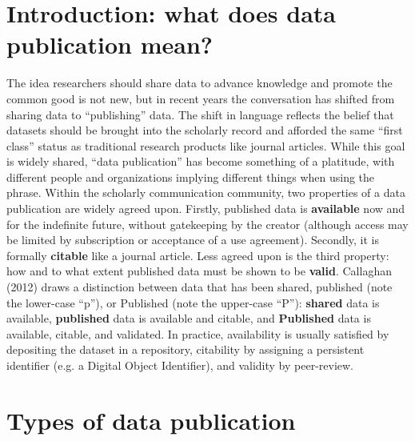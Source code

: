 \documentclass[10pt,a4paper,twocolumn]{article}
\begin{document}
\section*{Introduction: what does data publication mean?}\label{introduction}

The idea researchers should share data to advance knowledge and promote the common good is not new, but in recent years the conversation has shifted from sharing data to ``publishing'' data.\cite{costello_motivating_2009,smith_data_2009,lawrence_data_2011,callaghan_making_2012} 
The shift in language reflects the belief that datasets should be brought into the scholarly record and afforded the same ``first class'' status as traditional research products like journal articles.  
While this goal is widely shared, ``data publication'' has become something of a platitude, with different people and organizations implying different things when using the phrase.
Within the scholarly communication community, two properties of a data publication are widely agreed upon.\cite{smith_data_2009,callaghan_making_2012}
Firstly, published data is \textbf{available} now and for the indefinite future, without gatekeeping by the creator (although access may be limited by subscription or acceptance of a use agreement).
Secondly, it is formally \textbf{citable} like a journal article.
Less agreed upon is the third property: how and to what extent published data must be shown to be \textbf{valid}.
Callaghan (2012)\cite{callaghan_making_2012} draws a distinction between data that has been shared, published (note the lower-case ``p''), or Published (note the upper-case ``P''): \textbf{shared} data is available, \textbf{published} data is available and citable, and \textbf{Published} data is available, citable, and validated. 
In practice, availability is usually satisfied by depositing the dataset in a repository, citability by assigning a persistent identifier (e.g. a Digital Object Identifier), and validity by peer-review.


\section*{Types of data publication}\label{types-of-data-publication}
\end{document}

